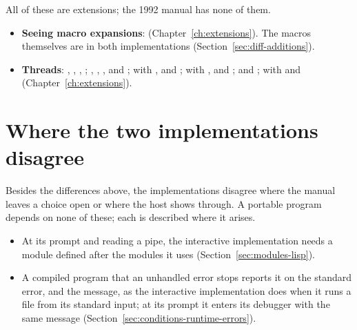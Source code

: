 All of these are extensions; the 1992 manual has none of them.

\begin{itemize}
\item \textbf{Seeing macro expansions}: 
  (Chapter~\ref{ch:extensions}). The macros themselves are in both
  implementations (Section~\ref{sec:diff-additions}).
\item \textbf{Threads}: , ,
  , ; ,
  , ,  and
  ;  with
  ,  and
  ;  with
  ,  and
  ;  and
  ;  with
   and 
  (Chapter~\ref{ch:extensions}).
\end{itemize}

\section{Where the two implementations disagree}\label{sec:diff-between}

Besides the differences above, the implementations disagree where the
manual leaves a choice open or where the host shows through. A portable
program depends on none of these; each is described where it arises.

\begin{itemize}
\item At its prompt and reading a pipe, the interactive implementation
  needs a module defined after the modules it uses
  (Section~\ref{sec:modules-lisp}).
\item A compiled program that an unhandled error stops reports it on
  the standard error,  and the message, as the
  interactive implementation does when it runs a file from its standard
  input; at its prompt it enters its debugger with the same message
  (Section~\ref{sec:conditions-runtime-errors}).
\end{itemize}

\fussy
